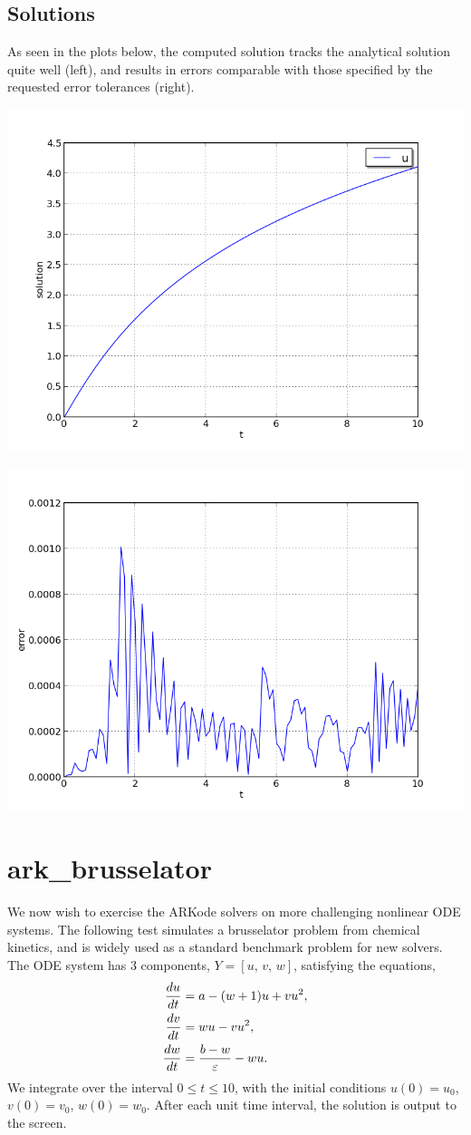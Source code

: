 \documentclass[letterpaper,10pt,english]{sphinxmanual}
\begin{document}
\subsection{Solutions}
\label{c_serial:id4}
As seen in the plots below, the computed solution tracks the
analytical solution quite well (left), and results in errors
comparable with those specified by the requested error tolerances
(right).

\includegraphics[width=0.450\linewidth]{plot-ark_analytic_nonlin.png}

\includegraphics[width=0.450\linewidth]{plot-ark_analytic_nonlin_error.png}


\section{ark\_brusselator}
\label{c_serial:ark-brusselator}\label{c_serial:id5}
We now wish to exercise the ARKode solvers on more challenging
nonlinear ODE systems.  The following test simulates a brusselator
problem from chemical kinetics, and is widely used as a standard
benchmark problem for new solvers.  The ODE system has 3 components,
\(Y = [u,\, v,\, w]\), satisfying the equations,
\begin{gather}
\begin{split}\frac{du}{dt} &= a - (w+1)u + v u^2, \\
\frac{dv}{dt} &= w u - v u^2, \\
\frac{dw}{dt} &= \frac{b-w}{\varepsilon} - w u.\end{split}\notag
\end{gather}
We integrate over the interval \(0 \le t \le 10\), with the
initial conditions \(u(0) = u_0\), \(v(0) = v_0\), \(w(0)
= w_0\). After each unit time interval, the solution is output to the
screen.
\end{document}
